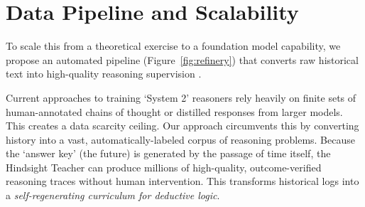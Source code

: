\documentclass[11pt,a4paper]{article}
\begin{document}
\section{Data Pipeline and Scalability}
\label{sec:pipeline}

To scale this from a theoretical exercise to a foundation model capability, we propose an automated pipeline (Figure~\ref{fig:refinery}) that converts raw historical text into high-quality reasoning supervision \cite{gunasekar2023textbooks, li2023synthetic}.

\medskip\noindent
Current approaches to training `System 2' reasoners rely heavily on finite sets of human-annotated chains of thought or distilled responses from larger models. This creates a data scarcity ceiling. Our approach circumvents this by converting history into a vast, automatically-labeled corpus of reasoning problems. Because the `answer key' (the future) is generated by the passage of time itself, the Hindsight Teacher can produce millions of high-quality, outcome-verified reasoning traces without human intervention. This transforms historical logs into a \textit{self-regenerating curriculum for deductive logic}.
\end{document}
